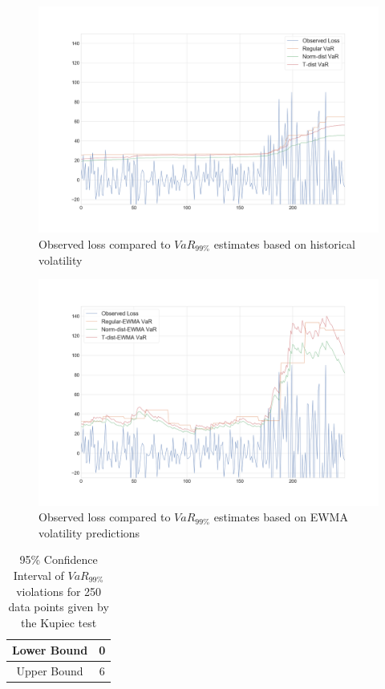 \documentclass[a4paper]{article}
\begin{document}
\begin{figure}[H]
    \includegraphics[width=\textwidth]{VaR1.png}
    \caption{Observed loss compared to $VaR_{99\%}$ estimates based on historical volatility}
    \label{var1}
\end{figure}

\begin{figure}[H]
    \includegraphics[width=\textwidth]{VaR2.png}
    \caption{Observed loss compared to $VaR_{99\%}$ estimates based on EWMA volatility predictions}
    \label{var2}
\end{figure}

\begin{table}[H]
	\centering
    \caption{95\% Confidence Interval of $VaR_{99\%}$ violations for 250 data points given by the Kupiec test}
    \vspace{0.2cm}
    \begin{tabular}{|c|c|}
        \hline
        Lower Bound & 0  \\ \hline
        Upper Bound & 6  \\\hline
	\end{tabular}
\end{table}
\end{document}
